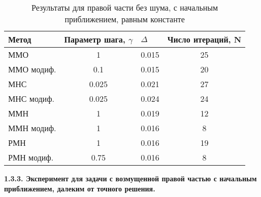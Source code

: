 \begin{table}[H]
	\centering
	\caption{Результаты для правой части без шума, с начальным приближением, равным константе}
	\label{table1.2}
	\begin{tabular}{|l|c|c|c|}
		\hline
		\textbf{Метод}                   & \multicolumn{1}{l|}{\textbf{Параметр шага, $\gamma$}} & \multicolumn{1}{l|}{\textbf{$\Delta$}} & \multicolumn{1}{l|}{\textbf{Число итераций, N}} \\ \hline
		ММО                              & 1                                                     & 0.015                                  & 25                                              \\ \hline
		\multicolumn{1}{|r|}{ММО модиф.} & 0.1                                                   & 0.015                                  & 20                                              \\ \hline
		МНС                              & 0.025                                                 & 0.021                                  & 27                                              \\ \hline
		МНС модиф.                       & 0.025                                                 & 0.024                                  & 24                                              \\ \hline
		ММН                              & 1                                                     & 0.019                                  & 12                                              \\ \hline
		ММН модиф.                       & 1                                                     & 0.016                                  & 8                                               \\ \hline
		РМН                              & 1                                                     & 0.016                                  & 19                                              \\ \hline
		РМН модиф.                       & 0.75                                                  & 0.016                                  & 8                                               \\ \hline
	\end{tabular}
\end{table}

{\bfseries 1.3.3. Эксперимент для задачи с возмущенной правой частью с начальным приближением, далеким от точного решения.} 

